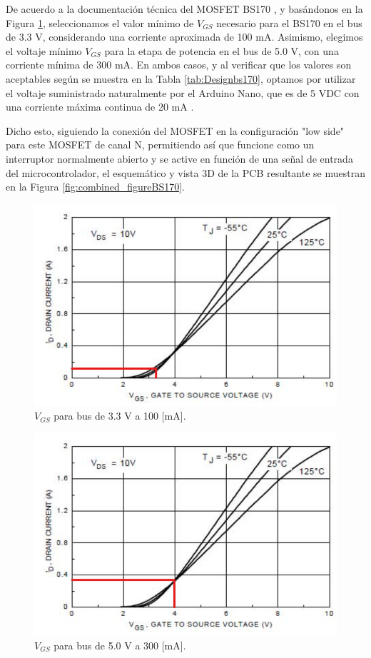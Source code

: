 De acuerdo a la documentación técnica del MOSFET BS170 \cite{BS170Datasheet}, y basándonos en la Figura \ref{fig:bs170vgsidrainA}, seleccionamos el valor mínimo de $V_{GS}$ necesario para el BS170 en el bus de 3.3 V, considerando una corriente aproximada de 100 mA. Asimismo, elegimos el voltaje mínimo $V_{GS}$ para la etapa de potencia en el bus de 5.0 V, con una corriente mínima de 300 mA. En ambos casos, y al verificar que los valores son aceptables según se muestra en la Tabla \ref{tab:Designbs170}, optamos por utilizar el voltaje suministrado naturalmente por el Arduino Nano, que es de 5 VDC con una corriente máxima continua de 20 mA \cite{arduino_getting_started}.

Dicho esto, siguiendo la conexión del MOSFET en la configuración "low side" para este MOSFET de canal N, permitiendo así que funcione como un interruptor normalmente abierto y se active en función de una señal de entrada del microcontrolador, el esquemático y vista 3D de la PCB resultante se muestran en la Figura \ref{fig:combined_figureBS170}.

\newpage

\begin{figure}[h]
  \centering
  \includegraphics[width=0.45\linewidth]{Pictures/33busvgsgraphic.png} 
  \caption{$V_{GS}$ para bus de 3.3 V a 100 [mA]. \cite{BS170Datasheet}}
  \label{fig:bs170vgsidrainA}
\end{figure}

\begin{figure}[h]
  \centering
  \includegraphics[width=0.45\linewidth]{Pictures/50busvgsgraphic.png} 
  \caption{$V_{GS}$ para bus de 5.0 V a 300 [mA]. \cite{BS170Datasheet}}
  \label{fig:bs170vgsidrainB}
\end{figure}

